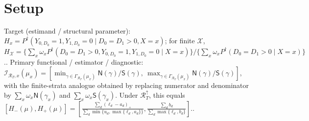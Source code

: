 \documentclass{article}
\begin{document}
\section{Setup}

Target (estimand / structural parameter): \(H_x=P^{\dagger}(Y_{0,D_0}=1,Y_{1,D_0}=0\mid D_0=D_1>0,X=x)\); for finite \(\mathcal X\), \(H_{\mathcal X}=\{\sum_x\omega_xP^{\dagger}(D_0=D_1>0,Y_{0,D_0}=1,Y_{1,D_0}=0\mid X=x)\}/\{\sum_x\omega_xP^{\dagger}(D_0=D_1>0\mid X=x)\}\)..
Primary functional / estimator / diagnostic: \(\mathcal I_{\mathcal R_T,x}(\mu_x)=[\min_{\gamma\in\Gamma_{\mathcal R_T}(\mu_x)}\mathsf N(\gamma)/\mathsf S(\gamma),\ \max_{\gamma\in\Gamma_{\mathcal R_T}(\mu_x)}\mathsf N(\gamma)/\mathsf S(\gamma)]\), with the finite-strata analogue obtained by replacing numerator and denominator by \(\sum_x\omega_x\mathsf N(\gamma_x)\) and \(\sum_x\omega_x\mathsf S(\gamma_x)\). Under \(\mathcal R_T^{\uparrow}\), this equals \([H_-(\mu),H_+(\mu)]=[\frac{\sum_d(\ell_d-a_d)_+}{\sum_d\min\{u_d,\max\{\ell_d,a_d\}\}},\frac{\sum_db_d}{\sum_d\max\{\ell_d,b_d\}}]\)..
\end{document}
